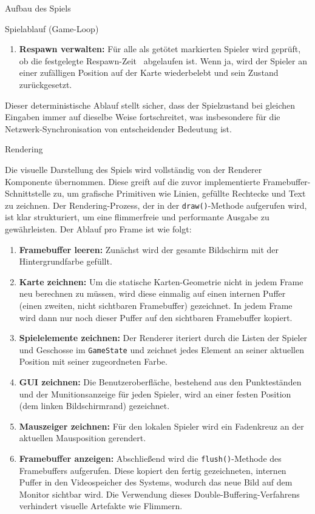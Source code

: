 \begin{section}{Aufbau des Spiels}
\begin{subsection}{Spielablauf (Game-Loop)}
\begin{enumerate}
Ein Spieler kann sich nicht selbst treffen.
    \item \textbf{Respawn verwalten:} Für alle als getötet markierten Spieler wird geprüft, ob die festgelegte Respawn-Zeit~\cite{larksuite_glossary_respawn} abgelaufen ist.
Wenn ja, wird der Spieler an einer zufälligen Position auf der Karte wiederbelebt und sein Zustand zurückgesetzt.
\end{enumerate}
Dieser deterministische Ablauf stellt sicher, dass der Spielzustand bei gleichen Eingaben immer auf dieselbe Weise fortschreitet, was insbesondere für die Netzwerk-Synchronisation von entscheidender Bedeutung ist.
\end{subsection}

\begin{subsection}{Rendering}

Die visuelle Darstellung des Spiels wird vollständig von der Renderer Komponente übernommen.
Diese greift auf die zuvor implementierte Framebuffer-Schnittstelle zu, um grafische Primitiven wie Linien, gefüllte Rechtecke und Text zu zeichnen.
Der Rendering-Prozess, der in der \texttt{draw()}-Methode aufgerufen wird, ist klar strukturiert, um eine flimmerfreie und performante Ausgabe zu gewährleisten.
Der Ablauf pro Frame ist wie folgt:
\begin{enumerate}
    \item \textbf{Framebuffer leeren:} Zunächst wird der gesamte Bildschirm mit der Hintergrundfarbe gefüllt.
    \item \textbf{Karte zeichnen:} Um die statische Karten-Geometrie nicht in jedem Frame neu berechnen zu müssen, wird diese einmalig auf einen internen Puffer (einen zweiten, nicht sichtbaren Framebuffer) gezeichnet.
In jedem Frame wird dann nur noch dieser Puffer auf den sichtbaren Framebuffer kopiert.
    \item \textbf{Spielelemente zeichnen:} Der Renderer iteriert durch die Listen der Spieler und Geschosse im \texttt{GameState} und zeichnet jedes Element an seiner aktuellen Position mit seiner zugeordneten Farbe.
    \item \textbf{GUI zeichnen:} Die Benutzeroberfläche, bestehend aus den Punkteständen und der Munitionsanzeige für jeden Spieler, wird an einer festen Position (dem linken Bildschirmrand) gezeichnet.
    \item \textbf{Mauszeiger zeichnen:} Für den lokalen Spieler wird ein Fadenkreuz an der aktuellen Mausposition gerendert.
    \item \textbf{Framebuffer anzeigen:} Abschließend wird die \texttt{flush()}-Methode des Framebuffers aufgerufen.
Diese kopiert den fertig gezeichneten, internen Puffer in den Videospeicher des Systems, wodurch das neue Bild auf dem Monitor sichtbar wird.
Die Verwendung dieses Double-Buffering-Verfahrens verhindert visuelle Artefakte wie Flimmern.
\end{enumerate}


\end{subsection}
\end{section}
